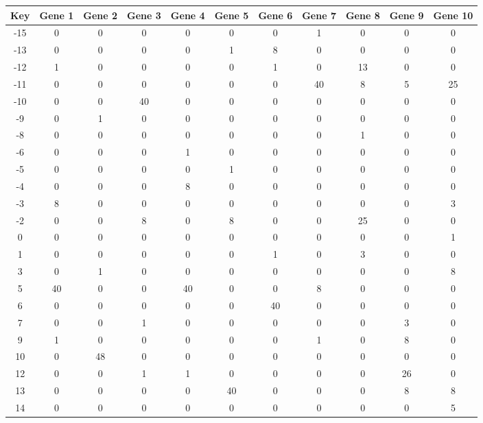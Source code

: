 \begin{tabular}{|c|c|c|c|c|c|c|c|c|c|c|}
\hline
Key & Gene 1 & Gene 2 & Gene 3 & Gene 4 & Gene 5 & Gene 6 & Gene 7 & Gene 8 & Gene 9 & Gene 10 \\
\hline
-15 & 0 & 0 & 0 & 0 & 0 & 0 & 1 & 0 & 0 & 0 \\
-13 & 0 & 0 & 0 & 0 & 1 & 8 & 0 & 0 & 0 & 0 \\
-12 & 1 & 0 & 0 & 0 & 0 & 1 & 0 & 13 & 0 & 0 \\
-11 & 0 & 0 & 0 & 0 & 0 & 0 & 40 & 8 & 5 & 25 \\
-10 & 0 & 0 & 40 & 0 & 0 & 0 & 0 & 0 & 0 & 0 \\
-9 & 0 & 1 & 0 & 0 & 0 & 0 & 0 & 0 & 0 & 0 \\
-8 & 0 & 0 & 0 & 0 & 0 & 0 & 0 & 1 & 0 & 0 \\
-6 & 0 & 0 & 0 & 1 & 0 & 0 & 0 & 0 & 0 & 0 \\
-5 & 0 & 0 & 0 & 0 & 1 & 0 & 0 & 0 & 0 & 0 \\
-4 & 0 & 0 & 0 & 8 & 0 & 0 & 0 & 0 & 0 & 0 \\
-3 & 8 & 0 & 0 & 0 & 0 & 0 & 0 & 0 & 0 & 3 \\
-2 & 0 & 0 & 8 & 0 & 8 & 0 & 0 & 25 & 0 & 0 \\
0 & 0 & 0 & 0 & 0 & 0 & 0 & 0 & 0 & 0 & 1 \\
1 & 0 & 0 & 0 & 0 & 0 & 1 & 0 & 3 & 0 & 0 \\
3 & 0 & 1 & 0 & 0 & 0 & 0 & 0 & 0 & 0 & 8 \\
5 & 40 & 0 & 0 & 40 & 0 & 0 & 8 & 0 & 0 & 0 \\
6 & 0 & 0 & 0 & 0 & 0 & 40 & 0 & 0 & 0 & 0 \\
7 & 0 & 0 & 1 & 0 & 0 & 0 & 0 & 0 & 3 & 0 \\
9 & 1 & 0 & 0 & 0 & 0 & 0 & 1 & 0 & 8 & 0 \\
10 & 0 & 48 & 0 & 0 & 0 & 0 & 0 & 0 & 0 & 0 \\
12 & 0 & 0 & 1 & 1 & 0 & 0 & 0 & 0 & 26 & 0 \\
13 & 0 & 0 & 0 & 0 & 40 & 0 & 0 & 0 & 8 & 8 \\
14 & 0 & 0 & 0 & 0 & 0 & 0 & 0 & 0 & 0 & 5 \\
\hline
\end{tabular}